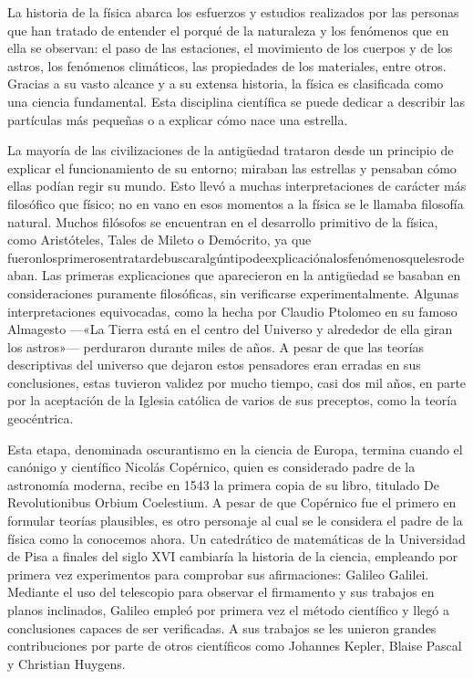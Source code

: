 \begin{small}
La historia de la física abarca los esfuerzos y estudios realizados por las personas que han tratado de entender el porqué de la naturaleza y los fenómenos que en ella se observan: el paso de las estaciones, el movimiento de los cuerpos y de los astros, los fenómenos climáticos, las propiedades de los materiales, entre otros. Gracias a su vasto alcance y a su extensa historia, la física es clasificada como una ciencia fundamental. Esta disciplina científica se puede dedicar a describir las partículas más pequeñas o a explicar cómo nace una estrella.
 
La mayoría de las civilizaciones de la antigüedad trataron desde un principio de explicar el funcionamiento de su entorno; miraban las estrellas y pensaban cómo ellas podían regir su mundo. Esto llevó a muchas interpretaciones de
carácter más filosófico que físico; no en vano en esos momentos a la física se le llamaba filosofía natural. Muchos
filósofos se encuentran en el desarrollo primitivo de la física, como Aristóteles, Tales de Mileto o Demócrito, ya que fueronlosprimerosentratardebuscaralgúntipodeexplicaciónalosfenómenosquelesrodeaban. Las primeras explicaciones que aparecieron en la antigüedad se basaban en consideraciones puramente filosóficas, sin verificarse experimentalmente. Algunas interpretaciones equivocadas, como la hecha por Claudio Ptolomeo en su famoso Almagesto —«La Tierra está en el centro del Universo y alrededor de ella giran los astros»— perduraron durante miles de años. A pesar de que las teorías descriptivas del universo que dejaron estos pensadores eran erradas en sus conclusiones, estas tuvieron validez por mucho tiempo, casi dos mil años, en parte por la aceptación de la Iglesia católica de varios de sus preceptos, como la teoría geocéntrica. 
 
Esta etapa, denominada oscurantismo en la ciencia de Europa, termina cuando el canónigo y científico Nicolás Copérnico, quien es considerado padre de la astronomía moderna, recibe en 1543 la primera copia de su libro, titulado De Revolutionibus Orbium Coelestium. A pesar de que Copérnico fue el primero en formular teorías plausibles, es otro personaje al cual se le considera el padre de la física como la conocemos ahora. Un catedrático de matemáticas de la Universidad de Pisa a finales del siglo XVI cambiaría la historia de la ciencia, empleando por primera vez experimentos para comprobar sus afirmaciones: Galileo Galilei. Mediante el uso del telescopio para observar el firmamento y sus trabajos en planos inclinados, Galileo empleó por primera vez el método científico y llegó a conclusiones capaces de ser verificadas. A sus trabajos se les unieron grandes contribuciones por parte de otros científicos como Johannes Kepler, Blaise Pascal y Christian Huygens.


\end{small}
